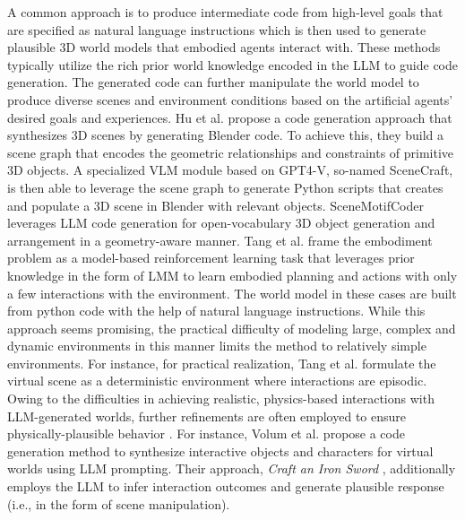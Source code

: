 \documentclass[10pt,journal,compsoc]{IEEEtran}
\begin{document}
	A common approach \cite{hu2024scenecraft,huang2023voxposer,tang2024worldcoder,ma2024llms,huang2023instruct2act} is to produce intermediate code from high-level goals that are specified as natural language instructions which is then used to generate plausible 3D world models that embodied agents interact with. These methods typically utilize the rich prior world knowledge encoded in the LLM to guide code generation. The generated code can further manipulate the world model to produce diverse scenes and environment conditions based on the artificial agents’ desired goals and experiences. Hu et al. \cite{hu2024scenecraft} propose a code generation approach that synthesizes 3D scenes by generating Blender code. To achieve this, they build a scene graph that encodes the geometric relationships and constraints of primitive 3D objects. A specialized VLM module based on GPT4-V, so-named SceneCraft, is then able to leverage the scene graph to generate Python scripts that creates and populate a 3D scene in Blender with relevant objects. SceneMotifCoder \cite{tam2024scenemotifcoder}leverages LLM code generation for open-vocabulary 3D object generation and arrangement in a geometry-aware manner. 
	Tang et al. \cite{tang2024worldcoder} frame the embodiment problem as a model-based reinforcement learning task that leverages prior knowledge in the form of LMM to learn embodied planning and actions with only a few interactions with the environment. The world model in these cases are built from python code with the help of natural language instructions. While this approach seems promising, the practical difficulty of modeling large, complex and dynamic environments in this manner limits the method to relatively simple environments. For instance, for practical realization, Tang et al. \cite{tang2024worldcoder} formulate the virtual scene as a deterministic environment where interactions are episodic. 
	Owing to the difficulties in achieving realistic, physics-based interactions with LLM-generated worlds, further refinements are often employed to ensure physically-plausible behavior \cite{volum2022craft,de2024llmr,numan2024spaceblender,qian2024shape}. For instance, Volum et al. propose a code generation method to synthesize interactive objects and characters for virtual worlds using LLM prompting. Their approach, \textit{Craft an Iron Sword} \cite{volum2022craft}, additionally employs the LLM to infer interaction outcomes and generate plausible response (i.e., in the form of scene manipulation). 
	
	
\end{document}
